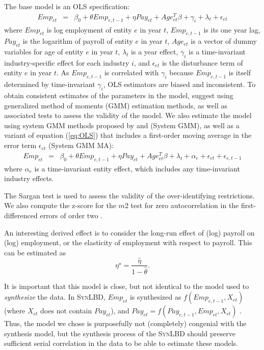 \documentclass[10pt]{article}
\newcommand{\SynLBD}{\textsc{SynLBD}}
\begin{document}
The base model is an OLS specification:
\begin{eqnarray}	
\label{eq:OLS}
Emp_{et} & = & \beta_0 + \theta Emp_{e,t-1} + \eta Pay_{et} + Age_{et}^{T}\beta + \gamma_i + \lambda_t + \epsilon_{et}
\end{eqnarray}
where $Emp_{et}$ is log employment of entity $e$ in year $t$, $Emp_{e,t-1}$ is its one year lag, $Pay_{et}$ is the logarithm of payroll of entity $e$ in year $t$, $Age_{et}$ is a vector of dummy variables for age of entity $e$ in year $t$, $\lambda_t$ is a year  effect, $\gamma_i$ is a time-invariant industry-specific effect for each industry $i$, and $\epsilon_{et}$ is the disturbance term of entity $e$ in year $t$. 
As $Emp_{e,t-1}$ is correlated with $\gamma_{i}$ because $Emp_{e,t-1}$ is itself determined by time-invariant $\gamma_{i}$, OLS estimators are biased and inconsistent. To obtain consistent estimates of the parameters in the model, \textcite{RePEc:oup:restud:v:58:y:1991:i:2:p:277-297.} suggest using  generalized method of moments (GMM) estimation methods, as well as associated tests to assess the  validity of the model.  
We also estimate the model using system GMM methods proposed by \textcite{RePEc:eee:econom:v:68:y:1995:i:1:p:29-51} and \textcite{RePEc:eee:econom:v:87:y:1998:i:1:p:115-143} (System GMM), as well as a variant of equation (\ref{eq:OLS}) that includes a first-order moving average in the error term $\epsilon_{et}$ (System GMM MA):
\begin{eqnarray}	
Emp_{et}&=&\beta_{0} +\theta Emp_{e,t-1}+\eta Pay_{et} + Age_{et}^{T}\beta + \lambda_t +\alpha_e   + \epsilon_{et} + \epsilon_{e,t-1}
\end{eqnarray}
where $\alpha_e$ is a time-invariant entity effect, which includes any time-invariant industry effects.

The Sargan test \parencite{hansen_large_1982,RePEc:oup:restud:v:58:y:1991:i:2:p:277-297.,blundell_estimation_2001} is used to assess the validity of the over-identifying restrictions. We also compute the z-score for the $m2$ test for zero autocorrelation in the  first-differenced errors of order two \parencite{RePEc:oup:restud:v:58:y:1991:i:2:p:277-297.}. 

An interesting derived effect is to consider the long-run effect of (log) payroll on (log) employment, or the elasticity of employment with respect to payroll. This can be estimated as
$$
\eta^\star = \frac{\hat{\eta}}{1-\hat{\theta}}.
$$

It is important that this model is close, but not identical to the model used to \textit{synthesize} the data. In \SynLBD, $Emp_{et}$ is synthesized as $f(Emp_{e,t-1},X_{et})$ (where $X_{et}$ does not contain $Pay_{et}$), and $Pay_{et} = f(Pay_{e,t-1},Emp_{et},X_{et})$ \citep[pg. 366]{KinneyEtAl2011}. Thus, the model we chose is purposefully not (completely) congenial with the synthesis model, but the synthesis process of the \SynLBD{} should preserve sufficient serial correlation in the data to be able to estimate these models.
\end{document}

